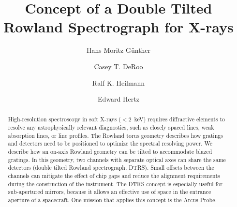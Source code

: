\documentclass[linenumbers]{aastex631}
\begin{document}
\title{Concept of a Double Tilted Rowland Spectrograph for X-rays}





\author[0000-0003-4243-2840]{Hans Moritz G{\"u}nther}
\author[0000-0002-9184-4561]{Casey T. DeRoo}
\author[0000-0001-9980-5295]{Ralf K. Heilmann}
\author[0000-0002-6747-9648]{Edward Hertz}


\begin{abstract}
High-resolution spectroscopy in soft X-rays ($<2$~keV) requires diffractive elements to resolve any astrophysically relevant diagnostics, such as closely spaced lines, weak absorption lines, or line profiles. The Rowland torus geometry describes how gratings and detectors need to be positioned to optimize the spectral resolving power. We describe how an on-axis Rowland geometry can be tilted to accommodate blazed gratings. In this geometry, two channels with separate optical axes can share the same detectors (double tilted Rowland spectrograph, DTRS). Small offsets between the channels can mitigate the effect of chip gaps and reduce the alignment requirements during the construction of the instrument. The DTRS concept is especially useful for sub-apertured mirrors, because it allows an effective use of space in the entrance aperture of a spacecraft.
One mission that applies this concept is the Arcus Probe.

\end{abstract}
\end{document}
